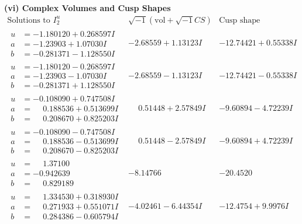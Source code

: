 \documentclass[1p]{elsarticle_modified}
\theoremstyle{definition}
\newcommand{\I}{\sqrt{-1}}
\begin{document}
\newpage\flushleft \textbf{(vi) Complex Volumes and Cusp Shapes}
$$\begin{array}{c|c|c}  
\text{Solutions to }I^u_{2}& \I (\text{vol} + \sqrt{-1}CS) & \text{Cusp shape}\\
 \hline 
\begin{aligned}
u &= -1.180120 + 0.268597 I \\
a &= -1.23903 + 1.07030 I \\
b &= -0.281371 - 1.128550 I\end{aligned}
 & -2.68559 + 1.13123 I & -12.74421 + 0.55338 I \\ \hline\begin{aligned}
u &= -1.180120 - 0.268597 I \\
a &= -1.23903 - 1.07030 I \\
b &= -0.281371 + 1.128550 I\end{aligned}
 & -2.68559 - 1.13123 I & -12.74421 - 0.55338 I \\ \hline\begin{aligned}
u &= -0.108090 + 0.747508 I \\
a &= \phantom{-}0.188536 + 0.513699 I \\
b &= \phantom{-}0.208670 + 0.825203 I\end{aligned}
 & \phantom{-}0.51448 + 2.57849 I & -9.60894 - 4.72239 I \\ \hline\begin{aligned}
u &= -0.108090 - 0.747508 I \\
a &= \phantom{-}0.188536 - 0.513699 I \\
b &= \phantom{-}0.208670 - 0.825203 I\end{aligned}
 & \phantom{-}0.51448 - 2.57849 I & -9.60894 + 4.72239 I \\ \hline\begin{aligned}
u &= \phantom{-}1.37100\phantom{ +0.000000I} \\
a &= -0.942639\phantom{ +0.000000I} \\
b &= \phantom{-}0.829189\phantom{ +0.000000I}\end{aligned}
 & -8.14766\phantom{ +0.000000I} & -20.4520\phantom{ +0.000000I} \\ \hline\begin{aligned}
u &= \phantom{-}1.334530 + 0.318930 I \\
a &= \phantom{-}0.271933 + 0.551071 I \\
b &= \phantom{-}0.284386 - 0.605794 I\end{aligned}
 & -4.02461 - 6.44354 I & -12.4754 + 9.9976 I \\ \hline\begin{aligned}

\end{aligned}
\end{array}$$
\end{document}
